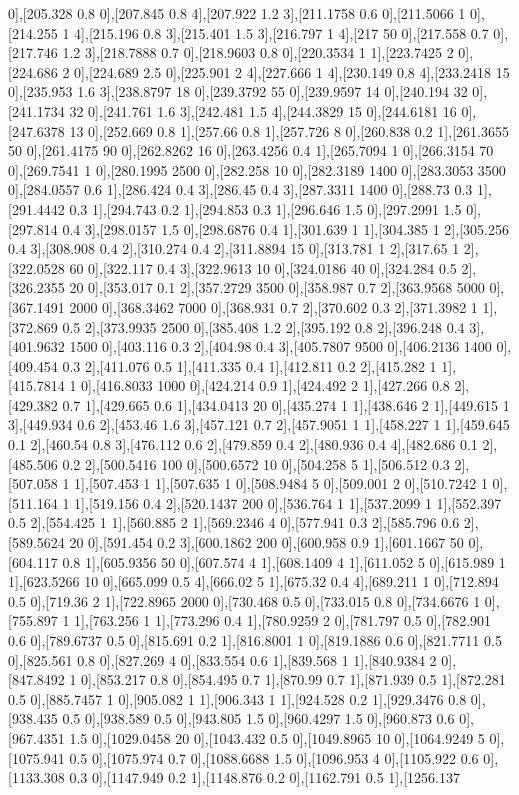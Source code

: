 {0],[205.328 0.8 0],[207.845 0.8 4],[207.922 1.2 3],[211.1758 0.6 0],[211.5066 1 0],[214.255 1 4],[215.196 0.8 3],[215.401 1.5 3],[216.797 1 4],[217 50 0],[217.558 0.7 0],[217.746 1.2 3],[218.7888 0.7 0],[218.9603 0.8 0],[220.3534 1 1],[223.7425 2 0],[224.686 2 0],[224.689 2.5 0],[225.901 2 4],[227.666 1 4],[230.149 0.8 4],[233.2418 15 0],[235.953 1.6 3],[238.8797 18 0],[239.3792 55 0],[239.9597 14 0],[240.194 32 0],[241.1734 32 0],[241.761 1.6 3],[242.481 1.5 4],[244.3829 15 0],[244.6181 16 0],[247.6378 13 0],[252.669 0.8 1],[257.66 0.8 1],[257.726 8 0],[260.838 0.2 1],[261.3655 50 0],[261.4175 90 0],[262.8262 16 0],[263.4256 0.4 1],[265.7094 1 0],[266.3154 70 0],[269.7541 1 0],[280.1995 2500 0],[282.258 10 0],[282.3189 1400 0],[283.3053 3500 0],[284.0557 0.6 1],[286.424 0.4 3],[286.45 0.4 3],[287.3311 1400 0],[288.73 0.3 1],[291.4442 0.3 1],[294.743 0.2 1],[294.853 0.3 1],[296.646 1.5 0],[297.2991 1.5 0],[297.814 0.4 3],[298.0157 1.5 0],[298.6876 0.4 1],[301.639 1 1],[304.385 1 2],[305.256 0.4 3],[308.908 0.4 2],[310.274 0.4 2],[311.8894 15 0],[313.781 1 2],[317.65 1 2],[322.0528 60 0],[322.117 0.4 3],[322.9613 10 0],[324.0186 40 0],[324.284 0.5 2],[326.2355 20 0],[353.017 0.1 2],[357.2729 3500 0],[358.987 0.7 2],[363.9568 5000 0],[367.1491 2000 0],[368.3462 7000 0],[368.931 0.7 2],[370.602 0.3 2],[371.3982 1 1],[372.869 0.5 2],[373.9935 2500 0],[385.408 1.2 2],[395.192 0.8 2],[396.248 0.4 3],[401.9632 1500 0],[403.116 0.3 2],[404.98 0.4 3],[405.7807 9500 0],[406.2136 1400 0],[409.454 0.3 2],[411.076 0.5 1],[411.335 0.4 1],[412.811 0.2 2],[415.282 1 1],[415.7814 1 0],[416.8033 1000 0],[424.214 0.9 1],[424.492 2 1],[427.266 0.8 2],[429.382 0.7 1],[429.665 0.6 1],[434.0413 20 0],[435.274 1 1],[438.646 2 1],[449.615 1 3],[449.934 0.6 2],[453.46 1.6 3],[457.121 0.7 2],[457.9051 1 1],[458.227 1 1],[459.645 0.1 2],[460.54 0.8 3],[476.112 0.6 2],[479.859 0.4 2],[480.936 0.4 4],[482.686 0.1 2],[485.506 0.2 2],[500.5416 100 0],[500.6572 10 0],[504.258 5 1],[506.512 0.3 2],[507.058 1 1],[507.453 1 1],[507.635 1 0],[508.9484 5 0],[509.001 2 0],[510.7242 1 0],[511.164 1 1],[519.156 0.4 2],[520.1437 200 0],[536.764 1 1],[537.2099 1 1],[552.397 0.5 2],[554.425 1 1],[560.885 2 1],[569.2346 4 0],[577.941 0.3 2],[585.796 0.6 2],[589.5624 20 0],[591.454 0.2 3],[600.1862 200 0],[600.958 0.9 1],[601.1667 50 0],[604.117 0.8 1],[605.9356 50 0],[607.574 4 1],[608.1409 4 1],[611.052 5 0],[615.989 1 1],[623.5266 10 0],[665.099 0.5 4],[666.02 5 1],[675.32 0.4 4],[689.211 1 0],[712.894 0.5 0],[719.36 2 1],[722.8965 2000 0],[730.468 0.5 0],[733.015 0.8 0],[734.6676 1 0],[755.897 1 1],[763.256 1 1],[773.296 0.4 1],[780.9259 2 0],[781.797 0.5 0],[782.901 0.6 0],[789.6737 0.5 0],[815.691 0.2 1],[816.8001 1 0],[819.1886 0.6 0],[821.7711 0.5 0],[825.561 0.8 0],[827.269 4 0],[833.554 0.6 1],[839.568 1 1],[840.9384 2 0],[847.8492 1 0],[853.217 0.8 0],[854.495 0.7 1],[870.99 0.7 1],[871.939 0.5 1],[872.281 0.5 0],[885.7457 1 0],[905.082 1 1],[906.343 1 1],[924.528 0.2 1],[929.3476 0.8 0],[938.435 0.5 0],[938.589 0.5 0],[943.805 1.5 0],[960.4297 1.5 0],[960.873 0.6 0],[967.4351 1.5 0],[1029.0458 20 0],[1043.432 0.5 0],[1049.8965 10 0],[1064.9249 5 0],[1075.941 0.5 0],[1075.974 0.7 0],[1088.6688 1.5 0],[1096.953 4 0],[1105.922 0.6 0],[1133.308 0.3 0],[1147.949 0.2 1],[1148.876 0.2 0],[1162.791 0.5 1],[1256.137 }
